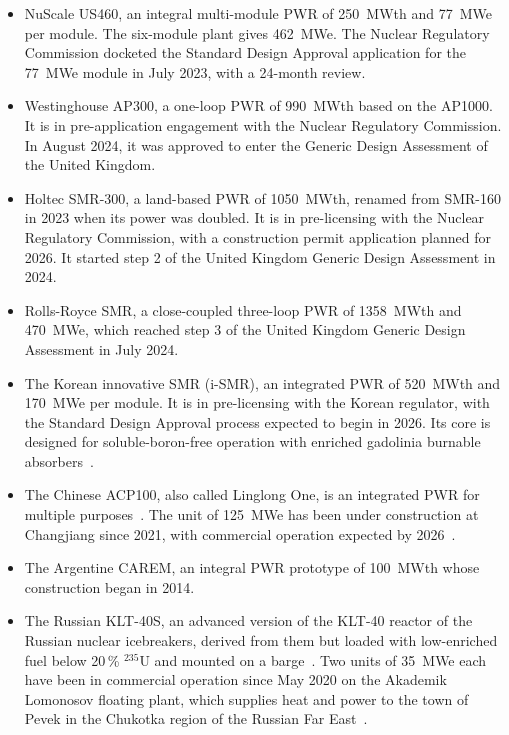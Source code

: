 \begin{itemize}
  \item NuScale US460, an integral multi-module PWR of 250~MWth and
        77~MWe per module. The six-module plant gives 462~MWe. The
        Nuclear Regulatory Commission docketed the Standard Design
        Approval application for the 77~MWe module in July 2023, with a
        24-month review.

  \item Westinghouse AP300, a one-loop PWR of 990~MWth based on the
        AP1000. It is in pre-application engagement with the Nuclear
        Regulatory Commission. In August 2024, it was approved to enter
        the Generic Design Assessment of the United Kingdom.

  \item Holtec SMR-300, a land-based PWR of 1050~MWth, renamed from
        SMR-160 in 2023 when its power was doubled. It is in
        pre-licensing with the Nuclear Regulatory Commission, with a
        construction permit application planned for 2026. It started
        step 2 of the United Kingdom Generic Design Assessment in 2024.

  \item Rolls-Royce SMR, a close-coupled three-loop PWR of 1358~MWth and
        470~MWe, which reached step 3 of the United Kingdom Generic
        Design Assessment in July 2024.

  \item The Korean innovative SMR (i-SMR), an integrated PWR of 520~MWth
        and 170~MWe per module. It is in pre-licensing with the Korean
        regulator, with the Standard Design Approval process expected to
        begin in 2026. Its core is designed for soluble-boron-free
        operation with enriched gadolinia burnable
        absorbers~\cite{ismr_sbf_2024}.

  \item The Chinese ACP100, also called Linglong One, is an integrated PWR
        for multiple purposes~\cite{nea_dashboard_2025}. The unit of
        125~MWe has been under construction at Changjiang since 2021,
        with commercial operation expected by
        2026~\cite{iaea_smr_2024}.

  \item The Argentine CAREM, an integral PWR prototype of 100~MWth whose
        construction began in 2014.

  \item The Russian KLT-40S, an advanced version of the KLT-40 reactor
        of the Russian nuclear icebreakers, derived from them but loaded
        with low-enriched fuel below 20\,\% $^{235}$U and mounted on a
        barge~\cite{wna_ships}. Two units of 35~MWe each have been in
        commercial operation since May 2020 on the Akademik Lomonosov
        floating plant, which supplies heat and power to the town of
        Pevek in the Chukotka region of the Russian Far
        East~\cite{iaea_smr_2024}.


\end{itemize}
